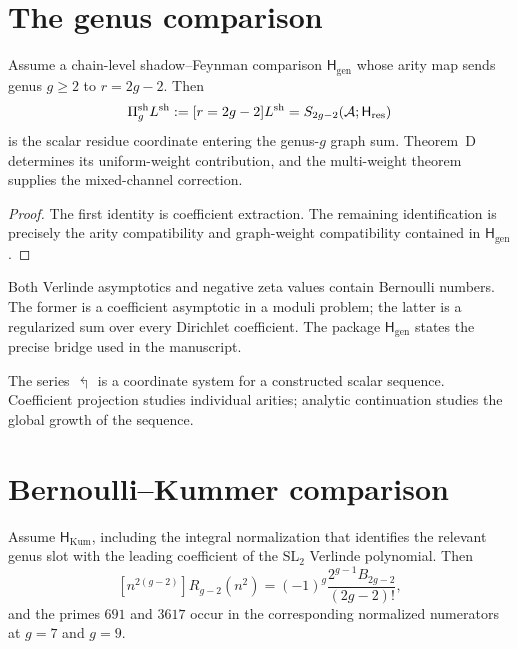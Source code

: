\section{The genus comparison}
\label{sec:shL-correct-bridge}

\begin{theorem}
\label{thm:Fg-from-L-sh-correctly}
\ClaimStatusConditional
Assume a chain-level shadow--Feynman comparison
\(\mathsf H_{\mathrm{gen}}\) whose arity map sends genus \(g\ge2\)
to \(r=2g-2\).  Then
\[
 \Pi_g^{\mathrm{sh}}L^{\mathrm{sh}}
 :=[r=2g-2]L^{\mathrm{sh}}=S_{2g-2}(\mathcal A;\mathsf H_{\mathrm{res}})
\]
is the scalar residue coordinate entering the genus-\(g\) graph sum.
Theorem~D determines its uniform-weight contribution, and the
multi-weight theorem supplies the mixed-channel correction.
\end{theorem}

\begin{proof}
The first identity is coefficient extraction.  The remaining
identification is precisely the arity compatibility and graph-weight
compatibility contained in \(\mathsf H_{\mathrm{gen}}\).
\end{proof}

\begin{remark}
\label{rem:shL-why-naive-seemed-plausible}
Both Verlinde asymptotics and negative zeta values contain Bernoulli
numbers.  The former is a coefficient asymptotic in a moduli problem;
the latter is a regularized sum over every Dirichlet coefficient.  The
package \(\mathsf H_{\mathrm{gen}}\) states the precise bridge used in
the manuscript.
\end{remark}

\begin{remark}
\label{rem:shL-positive-content-of-correction}
The series \(\Lsh\) is a coordinate system for a constructed scalar
sequence.  Coefficient projection studies individual arities;
analytic continuation studies the global growth of the sequence.
\end{remark}

\section{Bernoulli--Kummer comparison}
\label{sec:shL-kummer}

\begin{theorem}
\label{thm:kummer-congruence-prediction}
\ClaimStatusConditional
Assume \(\mathsf H_{\mathrm{Kum}}\), including the integral
normalization that identifies the relevant genus slot with the leading
coefficient of the \(\mathrm{SL}_2\) Verlinde polynomial.  Then
\[
 [n^{2(g-2)}]R_{g-2}(n^2)
 =(-1)^g\frac{2^{g-1}B_{2g-2}}{(2g-2)!},
\]
and the primes \(691\) and \(3617\) occur in the corresponding
normalized numerators at \(g=7\) and \(g=9\).
\end{theorem}

